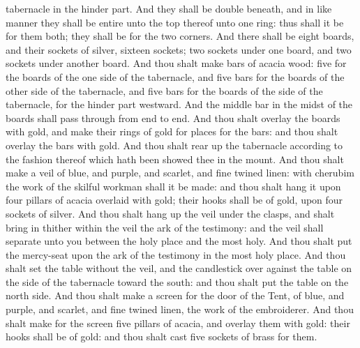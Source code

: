 tabernacle in the hinder part. And they shall be double beneath, and in like manner they shall be entire unto the top thereof unto one ring: thus shall it be for them both; they shall be for the two corners. And there shall be eight boards, and their sockets of silver, sixteen sockets; two sockets under one board, and two sockets under another board.  And thou shalt make bars of acacia wood: five for the boards of the one side of the tabernacle, and five bars for the boards of the other side of the tabernacle, and five bars for the boards of the side of the tabernacle, for the hinder part westward. And the middle bar in the midst of the boards shall pass through from end to end. And thou shalt overlay the boards with gold, and make their rings of gold for places for the bars: and thou shalt overlay the bars with gold. And thou shalt rear up the tabernacle according to the fashion thereof which hath been showed thee in the mount.  And thou shalt make a veil of blue, and purple, and scarlet, and fine twined linen: with cherubim the work of the skilful workman shall it be made: and thou shalt hang it upon four pillars of acacia overlaid with gold; their hooks shall be of gold, upon four sockets of silver. And thou shalt hang up the veil under the clasps, and shalt bring in thither within the veil the ark of the testimony: and the veil shall separate unto you between the holy place and the most holy. And thou shalt put the mercy-seat upon the ark of the testimony in the most holy place. And thou shalt set the table without the veil, and the candlestick over against the table on the side of the tabernacle toward the south: and thou shalt put the table on the north side.  And thou shalt make a screen for the door of the Tent, of blue, and purple, and scarlet, and fine twined linen, the work of the embroiderer. And thou shalt make for the screen five pillars of acacia, and overlay them with gold: their hooks shall be of gold: and thou shalt cast five sockets of brass for them. 

